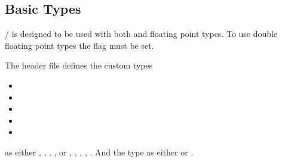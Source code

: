 \subsection{Basic Types}

\ANLOpenCL/ is designed to be used with both  and 
floating point types. To use double floating point types the 
flag  must be set.

The header file  defines the custom types 

\begin{itemize}
\item {}
\item {}
\item {}
\item {}
\item {}
\end{itemize}

as either , , , , 
 or , , , , 
. And the  type as either 
or .

